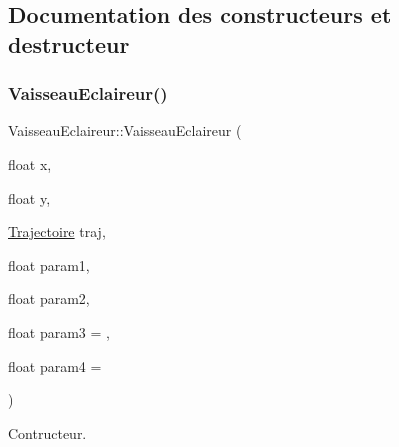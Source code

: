 \subsection{Documentation des constructeurs et destructeur}
\mbox{\label{class_vaisseau_eclaireur_ab65919df2049e350f83a77b625870fcc}} 
\subsubsection{\texorpdfstring{Vaisseau\+Eclaireur()}{VaisseauEclaireur()}}
{\footnotesize\ttfamily Vaisseau\+Eclaireur\+::\+Vaisseau\+Eclaireur (\begin{DoxyParamCaption}\item[{float}]{x,  }\item[{float}]{y,  }\item[{\hyperlink{_trajectoire_8h_afa7f6e8323d7ee755d93cd1f6019dd95}{Trajectoire}}]{traj,  }\item[{float}]{param1,  }\item[{float}]{param2,  }\item[{float}]{param3 = {},  }\item[{float}]{param4 = {} }\end{DoxyParamCaption})}



Contructeur. 


